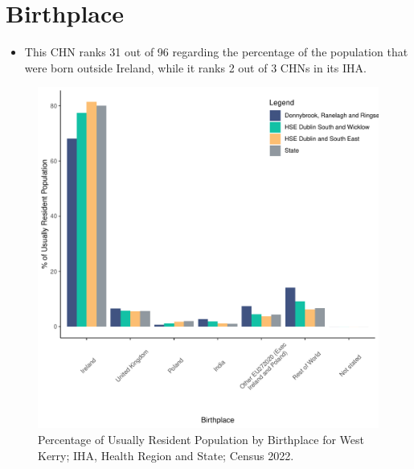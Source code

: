 \documentclass{article}
\begin{document}
\section{Birthplace}\label{sect:Birth}
\begin{itemize}
\item This CHN ranks  31 out of 96 regarding the percentage of the population that were born outside Ireland, while it ranks  2 out of 3 CHNs in its IHA.
\end{itemize}
\begin{figure}[H]
	\centering
	\includegraphics[width = 130mm]{../figures/BirthED.pdf}
	\caption{Percentage of Usually Resident Population by Birthplace for West Kerry; IHA, Health Region and State; Census 2022.}
	\label{fig:vbnv}
	\end{figure}
	
\end{document}

